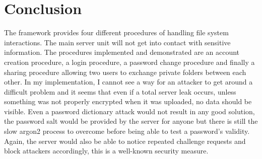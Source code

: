\section{Conclusion}
The framework provides four different procedures of handling file system interactions. The main server unit will not get into contact with sensitive information. The procedures implemented and demonstrated are an account creation procedure, a login procedure, a password change procedure and finally a sharing procedure allowing two users to exchange private folders between each other. In my implementation, I cannot see a way for an attacker to get around a difficult problem and it seems that even if a total server leak occurs, unless something was not properly encrypted when it was uploaded, no data should be visible. Even a password dictionary attack would not result in any good solution, the password salt would be provided by the server for anyone but there is still the slow argon2 process to overcome before being able to test a password's validity. Again, the server would also be able to notice repeated challenge requests and block attackers accordingly, this is a well-known security measure. 